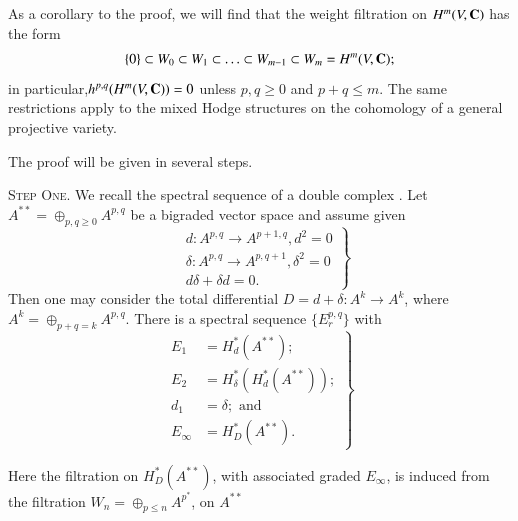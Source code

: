 As a corollary to the proof, we will find that the weight filtration on $H^m (V, \mathbf{C})$ has the form 
$$
\{0\} \subset W_0 \subset W_1 \subset \ldots \subset W_{m-1} \subset W_m  = H^m (V, \mathbf{C}); 
$$
in particular,\pageoriginale $h^{p,q} (H^m (V, \mathbf{C})) =0$ unless $p, q \geqslant 0$ and $p+q \leqslant m$. The same restrictions apply to the mixed Hodge structures on the cohomology of a general projective variety.

The proof will be given in several steps.

\textsc{Step One.} We recall the spectral sequence of a double complex \cite{art4-key17}. Let $A^{\ast \ast} = \oplus_{p,q \geqslant 0} A^{p,q}$ be a bigraded vector space and assume given
\setcounter{equation}{2}
\begin{equation}
\left.
\begin{aligned}
& d : A^{p,q} \to A^{p+1, q}, d^2 = 0\\
&  \delta : A^{p,q} \to A^{p, q+1} , \delta^2 =0\\
& d \delta +\delta d = 0.
\end{aligned} 
\right\}
\label{art4-eq4.3}
\end{equation}
Then one may consider the total differential $D = d + \delta : A^k \to A^k$, where $A^k = \oplus_{p+q = k} A^{p,q}$. There is a spectral sequence $\{E^{p,q}_r\}$ with
\begin{equation}
\left.
\begin{aligned}
E_1 & = H^\ast_d (A^{\ast \ast}); \\
E_2 & = H^\ast_{\delta} (H^\ast_d (A^{\ast \ast}));\\
d_1 & = \delta; \text{ and }\\
E_\infty & = H^\ast_D (A^{\ast \ast}).
\end{aligned}
\right\}
\label{art4-eq4.4}         
\end{equation}

Here the filtration on $H^\ast_D (A^{\ast\ast})$, with associated graded $E_\infty$, is induced from the filtration $W_n = \oplus_{p \leqslant n} A^{p^\ast}$, on $A^{\ast\ast}$

